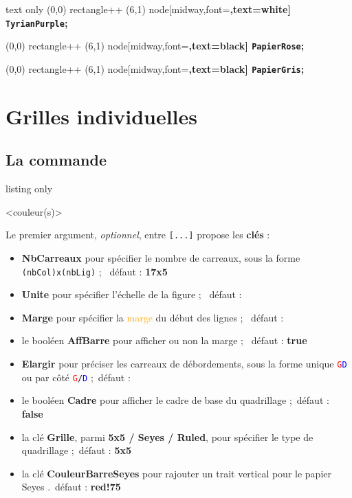 \documentclass[a4paper]{article}
\newcommand\Cle[1]{{\bfseries\sffamily\textlangle #1\textrangle}}
\begin{document}
\begin{PresentationCode}{text only}
{\tikz \filldraw[TyrianPurple] (0,0) rectangle++ (6,1) node[midway,font=\bfseries\large,text=white] {\verb+TyrianPurple+};}

{\tikz \filldraw[PapierRose] (0,0) rectangle++ (6,1) node[midway,font=\bfseries\large,text=black] {\verb+PapierRose+};}

{\tikz \filldraw[PapierGris] (0,0) rectangle++ (6,1) node[midway,font=\bfseries\large,text=black] {\verb+PapierGris+};}
\end{PresentationCode}



\pagebreak

\section{Grilles individuelles}

\subsection{La commande}

\begin{PresentationCode}{listing only}

\AffQuadrillage[clés]<couleur(s)>
\end{PresentationCode}

Le premier argument, \textit{optionnel}, entre \texttt{[...]} propose les \Cle{clés} :

\begin{itemize}
	\item \Cle{NbCarreaux} pour spécifier le nombre de carreaux, sous la forme \texttt{(nbCol)x(nbLig)} ; \hfill~défaut : \Cle{17x5}
	\item \Cle{Unite} pour spécifier l'échelle de la figure ; \hfill~défaut : \Cle{1}
	\item \Cle{Marge} pour spécifier la \textcolor{orange}{marge} du début des lignes ; \hfill~défaut : \Cle{0}
	\item le booléen \Cle{AffBarre} pour afficher ou non la marge ; \hfill~défaut : \Cle{true}
	\item \Cle{Elargir} pour préciser les carreaux de débordements, sous la forme unique \texttt{\textcolor{red}{G}\textcolor{blue}{D}} ou par côté \texttt{\textcolor{red}{G}/\textcolor{blue}{D}} ;\hfill~défaut : \Cle{0}
	\item le booléen \Cle{Cadre} pour afficher le cadre de base du quadrillage ;\hfill~défaut : \Cle{false}
	\item la clé \Cle{Grille}, parmi \Cle{5x5 / Seyes / Ruled}, pour spécifier le type de quadrillage ;\hfill~défaut : \Cle{5x5}
	\item la clé \Cle{CouleurBarreSeyes} pour rajouter un trait vertical pour le papier Seyes .\hfill~défaut : \Cle{red!75}
\end{itemize}
\end{document}
